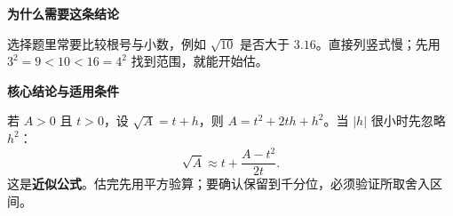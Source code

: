\clearpage
\begin{statementbox}
\textbf{\textcolor{CStatement}{为什么需要这条结论}}
\par\medskip
\begin{center}

\end{center}
\medskip
选择题里常要比较根号与小数，例如 $\sqrt{10}$ 是否大于 $3.16$。直接列竖式慢；先用 $3^2=9<10<16=4^2$ 找到范围，就能开始估。
\end{statementbox}
\clearpage
\begin{statementbox}
\textbf{\textcolor{CStatement}{核心结论与适用条件}}
\par\medskip
\begin{center}

\end{center}
\medskip
若 $A>0$ 且 $t>0$，设 $\sqrt A=t+h$，则 $A=t^2+2th+h^2$。当 $|h|$ 很小时先忽略 $h^2$：\[\boxed{\sqrt A\approx t+\frac{A-t^2}{2t}}.\] 这是\textbf{近似公式}。估完先用平方验算；要确认保留到千分位，必须验证所取舍入区间。
\end{statementbox}
